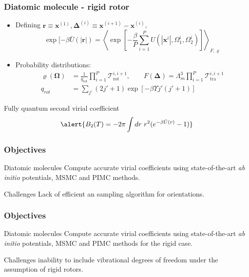 \documentclass[xcolor=svgnames]{beamer}
\DeclareRobustCommand{\abinitio}[0]{\emph{ab initio}}
\DeclareRobustCommand{\mc}[1]{\mathcal{#1}}
\DeclareRobustCommand{\mbf}[1]{{\boldsymbol {#1}}}
\begin{document}
        \begin{frame}
            \frametitle{Diatomic molecule - rigid rotor}
            \begin{itemize}
                \justifying
                \item Defining $\mbf{r} \equiv \mbf{x}^{(1)}, \mbf{\Delta}^{(i)} \equiv \mbf{x}^{(i+1)} - \mbf{x}^{(i)}$,
                \begin{equation*}
                    \exp [-\beta \bar{U} (|\mbf{r}|) = \left< \exp \left[ -\frac{\beta}{P} \sum_{i=1}^P U (|\mbf{x}^i|,\Omega_1^i,\Omega_2^i) \right] \right>_{F,\varrho}
                \end{equation*}
                \item Probability distributions:
                \begin{align*}
                    \varrho(\mbf{\Omega}) &= \frac{1}{q_\text{rot}} \displaystyle\prod_{i=1}^P \mc{T}_\text{rot}^{i,i+1}, \qquad F(\mbf{\Delta}) = \Lambda_m^3 \displaystyle\prod_{i=1}^P \mc{T}_\text{tra}^{i,i+1}\\
                    q_{rot} &= \displaystyle\sum_{j'} (2j' + 1) \exp \left[-\beta \Upsilon j' (j'+1) \right]
                \end{align*}
            \end{itemize}
            \begin{block}{Fully quantum second virial coefficient}
                \begin{equation*}
                    \alert{B_2 (T) = -2 \pi \displaystyle\int dr~ r^2 (e^{-\beta \bar{U} (r)} - 1)}
                \end{equation*}
            \end{block}
        \end{frame}
        \begin{frame}
            \frametitle{Objectives}
            \begin{block}{Diatomic molecules}
                Compute accurate virial coefficients using state-of-the-art \abinitio{} potentials, MSMC and PIMC methods.
            \end{block}
            \begin{alertblock}{Challenges}
                Lack of efficient an sampling algorithm for orientations.
            \end{alertblock}
        \end{frame}

        \begin{frame}
            \frametitle{Objectives}
            \begin{block}{Diatomic molecules}
                Compute accurate virial coefficients using state-of-the-art \abinitio{} potentials, MSMC and PIMC methods for the rigid case.
            \end{block}
                \begin{alertblock}{Challenges}
                    inability to include vibrational degrees of freedom under the assumption of rigid rotors.
                \end{alertblock}
        \end{frame}
\end{document}
